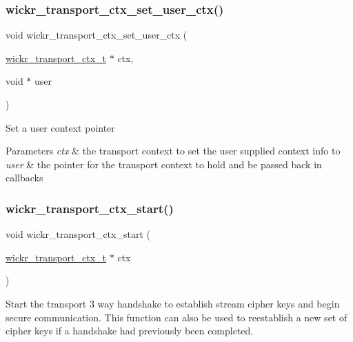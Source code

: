 \subsubsection{\texorpdfstring{wickr\+\_\+transport\+\_\+ctx\+\_\+set\+\_\+user\+\_\+ctx()}{wickr\_transport\_ctx\_set\_user\_ctx()}}
{\footnotesize\ttfamily void wickr\+\_\+transport\+\_\+ctx\+\_\+set\+\_\+user\+\_\+ctx (\begin{DoxyParamCaption}\item[{\mbox{\hyperlink{structwickr__transport__ctx}{wickr\+\_\+transport\+\_\+ctx\+\_\+t}} $\ast$}]{ctx,  }\item[{void $\ast$}]{user }\end{DoxyParamCaption})}

Set a user context pointer


\begin{DoxyParams}{Parameters}
{\em ctx} & the transport context to set the user supplied context info to \\
\hline
{\em user} & the pointer for the transport context to hold and be passed back in callbacks \\
\hline
\end{DoxyParams}
\mbox{\label{group__wickr__transport__ctx_gaee74761e31d5f0a6fc97e2ccf5ac1e29}} 
\subsubsection{\texorpdfstring{wickr\+\_\+transport\+\_\+ctx\+\_\+start()}{wickr\_transport\_ctx\_start()}}
{\footnotesize\ttfamily void wickr\+\_\+transport\+\_\+ctx\+\_\+start (\begin{DoxyParamCaption}\item[{\mbox{\hyperlink{structwickr__transport__ctx}{wickr\+\_\+transport\+\_\+ctx\+\_\+t}} $\ast$}]{ctx }\end{DoxyParamCaption})}

Start the transport 3 way handshake to establish stream cipher keys and begin secure communication. This function can also be used to reestablish a new set of cipher keys if a handshake had previously been completed.

